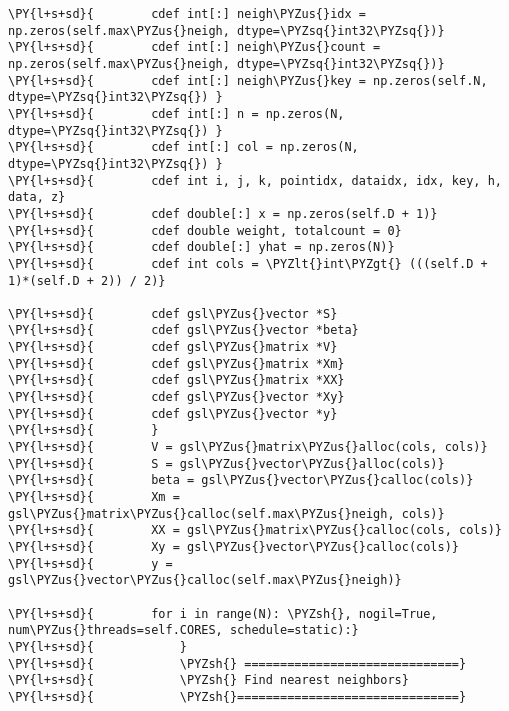 \begin{Verbatim}[commandchars=\\\{\}]
\PY{l+s+sd}{        cdef int[:] neigh\PYZus{}idx = np.zeros(self.max\PYZus{}neigh, dtype=\PYZsq{}int32\PYZsq{})}
\PY{l+s+sd}{        cdef int[:] neigh\PYZus{}count = np.zeros(self.max\PYZus{}neigh, dtype=\PYZsq{}int32\PYZsq{})}
\PY{l+s+sd}{        cdef int[:] neigh\PYZus{}key = np.zeros(self.N, dtype=\PYZsq{}int32\PYZsq{}) }
\PY{l+s+sd}{        cdef int[:] n = np.zeros(N, dtype=\PYZsq{}int32\PYZsq{}) }
\PY{l+s+sd}{        cdef int[:] col = np.zeros(N, dtype=\PYZsq{}int32\PYZsq{}) }
\PY{l+s+sd}{        cdef int i, j, k, pointidx, dataidx, idx, key, h, data, z}
\PY{l+s+sd}{        cdef double[:] x = np.zeros(self.D + 1)}
\PY{l+s+sd}{        cdef double weight, totalcount = 0}
\PY{l+s+sd}{        cdef double[:] yhat = np.zeros(N)}
\PY{l+s+sd}{        cdef int cols = \PYZlt{}int\PYZgt{} (((self.D + 1)*(self.D + 2)) / 2)}

\PY{l+s+sd}{        cdef gsl\PYZus{}vector *S}
\PY{l+s+sd}{        cdef gsl\PYZus{}vector *beta}
\PY{l+s+sd}{        cdef gsl\PYZus{}matrix *V}
\PY{l+s+sd}{        cdef gsl\PYZus{}matrix *Xm}
\PY{l+s+sd}{        cdef gsl\PYZus{}matrix *XX}
\PY{l+s+sd}{        cdef gsl\PYZus{}vector *Xy}
\PY{l+s+sd}{        cdef gsl\PYZus{}vector *y}
\PY{l+s+sd}{        }
\PY{l+s+sd}{        V = gsl\PYZus{}matrix\PYZus{}alloc(cols, cols)}
\PY{l+s+sd}{        S = gsl\PYZus{}vector\PYZus{}alloc(cols)}
\PY{l+s+sd}{        beta = gsl\PYZus{}vector\PYZus{}calloc(cols)}
\PY{l+s+sd}{        Xm = gsl\PYZus{}matrix\PYZus{}calloc(self.max\PYZus{}neigh, cols)}
\PY{l+s+sd}{        XX = gsl\PYZus{}matrix\PYZus{}calloc(cols, cols)}
\PY{l+s+sd}{        Xy = gsl\PYZus{}vector\PYZus{}calloc(cols)}
\PY{l+s+sd}{        y = gsl\PYZus{}vector\PYZus{}calloc(self.max\PYZus{}neigh)}

\PY{l+s+sd}{        for i in range(N): \PYZsh{}, nogil=True, num\PYZus{}threads=self.CORES, schedule=static):}
\PY{l+s+sd}{            }
\PY{l+s+sd}{            \PYZsh{} ==============================}
\PY{l+s+sd}{            \PYZsh{} Find nearest neighbors}
\PY{l+s+sd}{            \PYZsh{}===============================}


\end{Verbatim}
